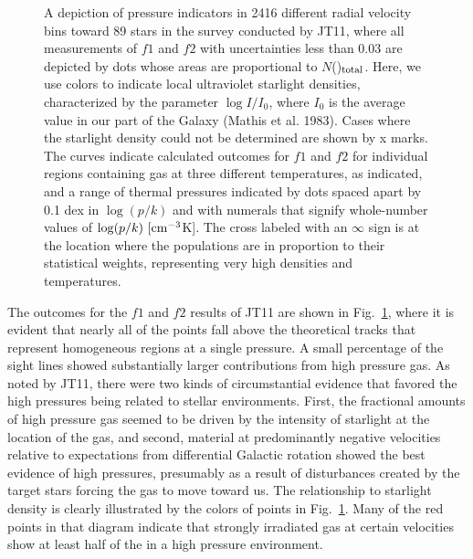 \documentclass[modern]{aastex63}
\begin{document}
\begin{figure}
\caption{A depiction of pressure indicators in 2416 different radial velocity bins toward 89 stars 
in the survey conducted by JT11, where all measurements of $f1$ and $f2$ with uncertainties 
less than 0.03 are depicted by dots whose areas are proportional to $N$()$_{\rm 
total}$.  Here, we use colors to indicate local ultraviolet starlight densities, characterized by the 
parameter $\log I/I_0$, where $I_0$ is the average value in our part of the Galaxy (Mathis et al. 
1983).  Cases where the starlight density could not be determined are shown by x marks.  The 
curves indicate calculated outcomes for $f1$ and $f2$ for individual regions containing gas at 
three different temperatures, as indicated, and a range of thermal pressures indicated by dots 
spaced apart by 0.1 dex in $\log (p/k)$ and with numerals that signify whole-number values of 
$\log (p/k)~[{\rm cm}^{-3}$K]. The cross labeled  with an $\infty$ sign is at the location where 
the populations are in proportion to their statistical weights, representing very high densities 
and temperatures.\label{fig:JT11_plot}}
\end{figure}

The outcomes for the $f1$ and $f2$ results of JT11 are shown in Fig.~\ref{fig:JT11_plot}, where 
it is evident that nearly all of the points fall above the theoretical tracks that represent 
homogeneous regions at a single pressure. A small percentage of the sight lines showed 
substantially larger contributions from high pressure gas.  As noted by JT11,  there were two 
kinds of circumstantial evidence that favored the high pressures being related to stellar 
environments.  First,  the fractional amounts of high pressure gas seemed to be driven by the 
intensity of starlight  at the location of the gas, and second, material at predominantly negative 
velocities relative to expectations from differential Galactic rotation showed the best evidence 
of high pressures, presumably as a result of disturbances created by the target stars forcing the 
gas to move toward us.  The relationship to starlight density is clearly illustrated by the colors of 
points in Fig.~\ref{fig:JT11_plot}.  Many of the red points in that diagram indicate that strongly 
irradiated gas at certain velocities show at least half of the  in a high pressure 
environment.
\end{document}
